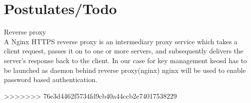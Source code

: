 \documentclass[]{article}
\begin{document}
\section{Postulates/Todo}


	\item Reverse proxy \\
	A Nginx HTTPS reverse proxy is an intermediary proxy service which takes a client request, passes it on to one or more servers, and subsequently delivers the server's response back to the client. 
	In our case for key management keosd has to be launched as daemon behind reverse proxy(nginx)
	nginx will be used to enable password based authentication.

>>>>>>> 76e3d4462f5734fd9cb40a44ccb2e74017538229
\end{document}

